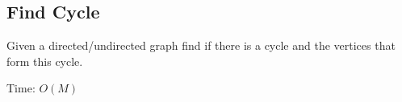 \subsection{Find Cycle}

Given a directed/undirected graph find if there is a cycle and the vertices that form this cycle.

Time: $O(M)$ 
